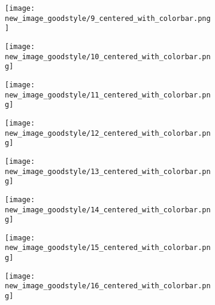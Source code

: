 \documentclass[a4paper,12pt]{article}
\begin{document}
\begin{figure}[H]
  \begin{subfigure}{0.11\textwidth}
    \texttt{[image: new\_image\_goodstyle/9\_centered\_with\_colorbar.png]}
  \end{subfigure}
  \hfill
  \begin{subfigure}{0.11\textwidth}
    \texttt{[image: new\_image\_goodstyle/10\_centered\_with\_colorbar.png]}
  \end{subfigure}
  \hfill
  \begin{subfigure}{0.11\textwidth}
    \texttt{[image: new\_image\_goodstyle/11\_centered\_with\_colorbar.png]}
  \end{subfigure}
  \hfill
  \begin{subfigure}{0.11\textwidth}
    \texttt{[image: new\_image\_goodstyle/12\_centered\_with\_colorbar.png]}
  \end{subfigure}
  \hfill
  \begin{subfigure}{0.11\textwidth}
    \texttt{[image: new\_image\_goodstyle/13\_centered\_with\_colorbar.png]}
  \end{subfigure}
  \hfill
  \begin{subfigure}{0.11\textwidth}
    \texttt{[image: new\_image\_goodstyle/14\_centered\_with\_colorbar.png]}
  \end{subfigure}
  \hfill
  \begin{subfigure}{0.11\textwidth}
    \texttt{[image: new\_image\_goodstyle/15\_centered\_with\_colorbar.png]}
  \end{subfigure}
  \hfill
  \begin{subfigure}{0.11\textwidth}
    \texttt{[image: new\_image\_goodstyle/16\_centered\_with\_colorbar.png]}
  \end{subfigure}
  \hfill
\end{figure}
\end{document}
